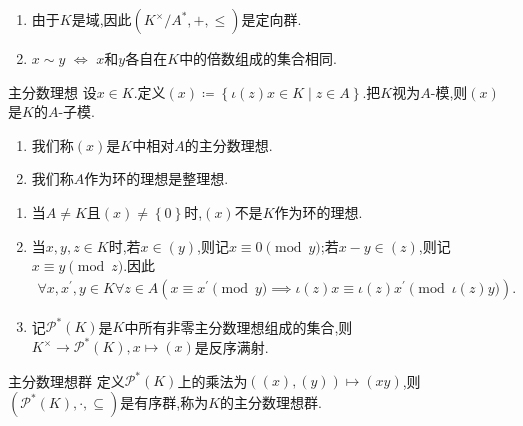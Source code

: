 \begin{remark}{}{}
	\begin{enumerate}
		\item 由于$K$是域,因此$\left(K^{\times}/A^{\ast},+,\leq\right)$是定向群.
		\item $x\sim y$ $\iff$ $x$和$y$各自在$K$中的倍数组成的集合相同.
	\end{enumerate}
\end{remark}

\begin{definition}{主分数理想}{}
	设$x\in K$.定义$\left(x\right)\coloneq\left\{\iota\left(z\right)x\in K\middle|z\in A\right\}$.把$K$视为$A$-模,则$\left(x\right)$是$K$的$A$-子模.
	\begin{enumerate}
		\item 我们称$\left(x\right)$是$K$中相对$A$的主分数理想.
		\item 我们称$A$作为环的理想是整理想.
	\end{enumerate}
\end{definition}

\begin{remark}{}{}
	\begin{enumerate}
		\item 当$A\neq K$且$\left(x\right)\neq\left\{0\right\}$时,$\left(x\right)$不是$K$作为环的理想.
		\item 当$x,y,z\in K$时,若$x\in\left(y\right)$,则记$x\equiv 0\pmod{y}$;若$x-y\in\left(z\right)$,则记$x\equiv y\pmod{z}$.因此
		\begin{align*}
			\forall x,x^{\prime},y\in K\forall z\in A\left(x\equiv x^{\prime}\pmod{y}\implies\iota\left(z\right)x\equiv\iota\left(z\right)x^{\prime}\pmod{\iota\left(z\right)y}\right).
		\end{align*}
		\item 记$\mathscr{P}^{\ast}\left(K\right)$是$K$中所有非零主分数理想组成的集合,则$K^{\times}\to\mathscr{P}^{\ast}\left(K\right),x\mapsto\left(x\right)$是反序满射.
	\end{enumerate}
\end{remark}

\begin{definition}{主分数理想群}{}
	定义$\mathscr{P}^{\ast}\left(K\right)$上的乘法为$\left(\left(x\right),\left(y\right)\right)\mapsto\left(xy\right)$,则$\left(\mathscr{P}^{\ast}\left(K\right),\cdot,\subseteq\right)$是有序群,称为$K$的主分数理想群.
\end{definition}

